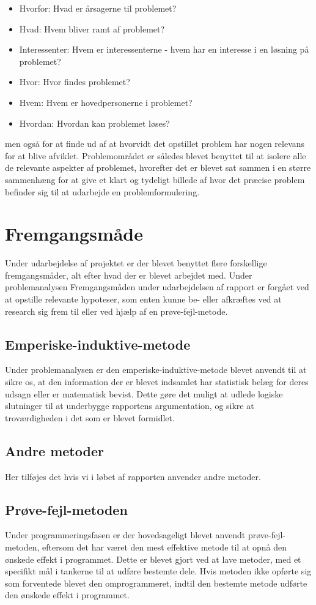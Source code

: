 \begin{itemize}
\item Hvorfor: Hvad er årsagerne til problemet?
\item Hvad: Hvem bliver ramt af problemet?
\item Interessenter: Hvem er interessenterne - hvem har en interesse i en løsning på problemet?
\item Hvor: Hvor findes problemet?
\item Hvem: Hvem er hovedpersonerne i problemet?
\item Hvordan: Hvordan kan problemet løses?
\end{itemize}
men også for at finde ud af at hvorvidt det opstillet problem har nogen relevans for at blive afviklet. Problemområdet er således blevet benyttet til at isolere alle de relevante aspekter af problemet, hvorefter det er blevet sat sammen i en større sammenhæng for at give et klart og tydeligt billede af hvor det præcise problem befinder sig til at udarbejde en problemformulering.

\section{Fremgangsmåde}
Under udarbejdelse af projektet er der blevet benyttet flere forskellige fremgangsmåder, alt efter hvad der er blevet arbejdet med. Under problemanalysen Fremgangsmåden under udarbejdelsen af rapport er forgået ved at opstille relevante hypoteser, som enten kunne be- eller afkræftes ved at research sig frem til eller ved hjælp af en prøve-fejl-metode.

\subsection{Emperiske-induktive-metode}
Under problemanalysen er den emperiske-induktive-metode blevet anvendt til at sikre os, at den information der er blevet indsamlet har statistisk belæg for deres udsagn eller er matematisk bevist. Dette gøre det muligt at udlede logiske slutninger til at underbygge rapportens argumentation, og sikre at troværdigheden i det som er blevet formidlet.

\subsection{Andre metoder}
Her tilføjes det hvis vi i løbet af rapporten anvender andre metoder. 

\subsection{Prøve-fejl-metoden}
Under programmeringsfasen er der hovedsageligt blevet anvendt prøve-fejl-metoden, eftersom det har været den mest effektive metode til at opnå den ønskede effekt i programmet. Dette er blevet gjort ved at lave metoder, med et specifikt mål i tankerne til at udføre bestemte dele. Hvis metoden ikke opførte sig som forventede blevet den omprogrammeret, indtil den bestemte metode udførte den ønskede effekt i programmet.

